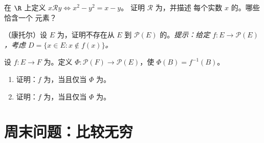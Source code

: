 \begin{exercise}[$\star\star$]\label{exo:b1:logic:10}
在 $\R$ 上定义 $x \mathbin{\mathcal{R}} y \iff x^2 - y^2 = x - y$。
证明 $\mathcal{R}$ 为，并描述
每个实数 $x$ 的。哪些恰含一个
元素？
\end{exercise}

\begin{exercise}[$\star\star\star$]\label{exo:b1:logic:11}
（康托尔）设 $E$ 为，证明不存在从 $E$
到 $\mathcal{P}(E)$ 的。\emph{提示：给定 $f \colon E \to
\mathcal{P}(E)$，考虑 $D = \{x \in E : x \notin f(x)\}$。}
\end{exercise}

\begin{exercise}[$\star\star\star$]\label{exo:b1:logic:12}
设 $f \colon E \to F$ 为。定义 $\Phi \colon \mathcal{P}(F)
\to \mathcal{P}(E)$，使 $\Phi(B) = f^{-1}(B)$。
\begin{enumerate}
  \item 证明：$f$ 为，当且仅当 $\Phi$
        为。
  \item 证明：$f$ 为，当且仅当 $\Phi$
        为。
\end{enumerate}
\end{exercise}

\section{周末问题：比较无穷}

